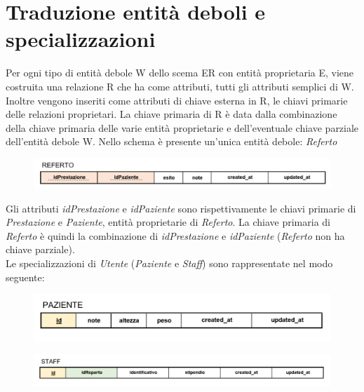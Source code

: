 \documentclass[paper=a4, fontsize=11pt,x11names]{report}
\begin{document}
\section{Traduzione entità deboli e specializzazioni}
Per ogni tipo di entità debole W dello scema ER con entità proprietaria E, viene costruita una relazione R che ha come attributi, tutti gli attributi semplici di W. Inoltre vengono inseriti come attributi di chiave esterna in R, le chiavi primarie delle relazioni proprietari. La chiave primaria di R è data dalla combinazione della chiave primaria delle varie entità proprietarie e dell'eventuale chiave parziale dell'entità debole W.
Nello schema è presente un'unica entità debole: \textit{Referto}
\begin{figure}[H]
\begin{center}
\includegraphics[scale=0.4]{refertoSchema}
\end{center}
\end{figure}
Gli attributi \textit{idPrestazione} e \textit{idPaziente} sono rispettivamente le chiavi primarie di \textit{Prestazione} e \textit{Paziente}, entità proprietarie di \textit{Referto}. La chiave primaria di \textit{Referto} è quindi la combinazione di \textit{idPrestazione} e \textit{idPaziente} (\textit{Referto} non ha chiave parziale).\\

Le specializzazioni di \textit{Utente} (\textit{Paziente} e \textit{Staff}) sono rappresentate nel modo seguente:
\begin{figure}[H]
\begin{center}
\includegraphics[scale=0.4]{pazienteSchema}
\end{center}
\end{figure}

\begin{figure}[H]
\begin{center}
\includegraphics[scale=0.4]{staffSchema}
\end{center}
\end{figure}
\end{document}
